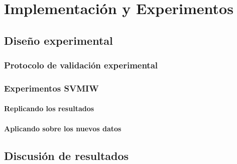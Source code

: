 \chapter{Implementación y Experimentos} 
\section{Diseño experimental} 
\subsection{Protocolo de validación experimental} 
\subsection{Experimentos SVMIW}
\subsubsection{Replicando los resultados}
\subsubsection{Aplicando sobre los nuevos datos}
\section{Discusión de resultados}
